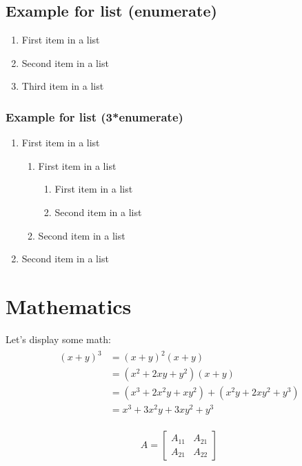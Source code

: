 \documentclass[paper=a4, fontsize=11pt]{scrartcl}	%
\numberwithin{equation}{section}															%
\numberwithin{figure}{section}																%
\numberwithin{table}{section}																%
\begin{document}
\subsection{Example for list (enumerate)}
\begin{enumerate}
	\item First item in a list 
	\item Second item in a list 
	\item Third item in a list
\end{enumerate}

\subsubsection{Example for list (3*enumerate)}
\begin{enumerate}
	\item First item in a list 
		\begin{enumerate}
		\item First item in a list 
			\begin{enumerate}
			\item First item in a list 
			\item Second item in a list 
			\end{enumerate}
		\item Second item in a list 
		\end{enumerate}
	\item Second item in a list 
\end{enumerate}

\section{Mathematics}
Let's display some math:
\begin{align} 
	\begin{split}
	(x+y)^3 	&= (x+y)^2(x+y)\\
					&=(x^2+2xy+y^2)(x+y)\\
					&=(x^3+2x^2y+xy^2) + (x^2y+2xy^2+y^3)\\
					&=x^3+3x^2y+3xy^2+y^3
	\end{split}					
\end{align}

\begin{align}
	A = 
	\begin{bmatrix}
	A_{11} & A_{21} \\
  	A_{21} & A_{22}
	\end{bmatrix}
\end{align}
\fi
\end{document}
